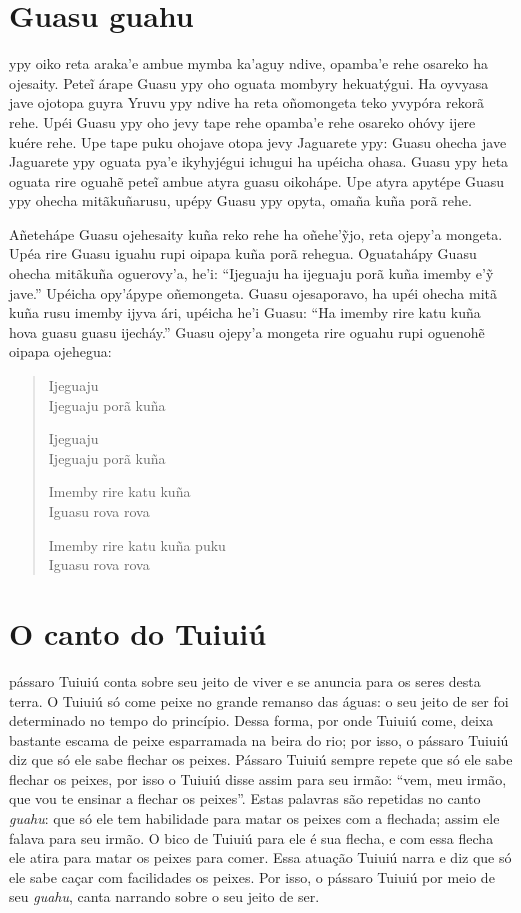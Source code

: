 \chapter{Guasu guahu}

 ypy oiko reta araka'e ambue mymba ka'aguy ndive, opamba'e rehe
osareko ha ojesaity. Peteĩ árape Guasu ypy oho oguata mombyry
hekuatýgui. Ha oyvyasa jave ojotopa guyra Yruvu ypy ndive ha reta
oñomongeta teko yvypóra rekorã rehe. Upéi Guasu ypy oho jevy tape rehe
opamba'e rehe osareko ohóvy ijere kuére rehe. Upe tape puku ohojave
otopa jevy Jaguarete ypy: Guasu ohecha jave Jaguarete ypy oguata pya'e
ikyhyjégui ichugui ha upéicha ohasa. Guasu ypy heta oguata rire oguahẽ
peteĩ ambue atyra guasu oikohápe. Upe atyra apytépe Guasu ypy ohecha
mitãkuñarusu, upépy Guasu ypy opyta, omaña kuña porã rehe.

Añetehápe Guasu ojehesaity kuña reko rehe ha oñehe'ỹjo, reta ojepy'a
mongeta. Upéa rire Guasu iguahu rupi oipapa kuña porã rehegua.
Oguatahápy Guasu ohecha mitãkuña oguerovy'a, he'i: ``Ijeguaju ha
ijeguaju porã kuña imemby e'ỹ jave.'' Upéicha opy'ápype oñemongeta.
Guasu ojesaporavo, ha upéi ohecha mitã kuña rusu imemby ijyva ári,
upéicha he'i Guasu: ``Ha imemby rire katu kuña hova guasu guasu
ijecháy.'' Guasu ojepy'a mongeta rire oguahu rupi oguenohẽ oipapa
ojehegua:

\begin{verse}
Ijeguaju\\
Ijeguaju porã kuña

Ijeguaju\\
Ijeguaju porã kuña

Imemby rire katu kuña\\ \EP[2]
Iguasu rova rova

Imemby rire katu kuña puku\\
Iguasu rova rova
\end{verse}

\chapter{O canto do Tuiuiú}

 pássaro Tuiuiú conta sobre seu jeito de viver e se anuncia para os
seres desta terra. O Tuiuiú só come peixe no grande remanso das águas: o
seu jeito de ser foi determinado no tempo do princípio. Dessa forma, por
onde Tuiuiú come, deixa bastante escama de peixe esparramada na beira do
rio; por isso, o pássaro Tuiuiú diz que só ele sabe flechar os peixes.
Pássaro Tuiuiú sempre repete que só ele sabe flechar os peixes, por isso
o Tuiuiú disse assim para seu irmão: ``vem, meu irmão, que vou te ensinar
a flechar os peixes''. Estas palavras são repetidas no canto \textit{guahu}:
que só ele tem habilidade para matar os peixes com a flechada; assim ele
falava para seu irmão. O bico de Tuiuiú para ele é sua flecha, e com
essa flecha ele atira para matar os peixes para comer. Essa atuação
Tuiuiú narra e diz que só ele sabe caçar com facilidades os peixes. Por
isso, o pássaro Tuiuiú por meio de seu \textit{guahu}, canta narrando
sobre o seu jeito de ser.


